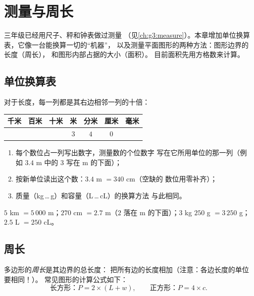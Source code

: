 \chapter{测量与周长}\label{ch:g4:measure}

三年级已经用尺子、秤和钟表做过测量
（见\cref{ch:g3:measure}）。本章增加单位换算表，它像一台能换算一切的“机器”，
以及测量平面图形的两种方法：图形边界的长度（周长），
和图形内部占据的大小（面积）。
目前面积先用方格数来计算。

\section{单位换算表}

\begin{method}[用换算表进行换算]\label{met:g4:measure:table}
对于长度，每一列都是其右边相邻一列的十倍：
\begin{center}
\renewcommand{\arraystretch}{1.3}
\begin{tabular}{c|c|c|c|c|c|c}
千米 & 百米 & 十米 & 米 & 分米 & 厘米 & 毫米 \\
\hline
 & & & $3$ & $4$ & $0$ & \\
\end{tabular}
\end{center}
\begin{enumerate}
  \item 每个数位占一列写出数字，测量数的个位数字
        写在它所用单位的那一列（例如 $3.4$ m 中的 $3$
        写在 m 的下面）；
  \item 按新单位读出这个数：$3.4$ m $= 340$ cm（空缺的
        数位用零补齐）；
  \item 质量（kg\,\dots\,g）和容量（L\,\dots\,cL）的换算方法
        与此相同。
\end{enumerate}
\end{method}

\begin{example}\label{ex:g4:measure:convert}
$5$ km $= 5\,000$ m；\quad $270$ cm $= 2.7$ m（$2$ 落在
m 的下面）；\quad $3$ kg $250$ g $= 3\,250$ g；\quad
$2.5$ L $= 250$ cL。
\end{example}

\section{周长}

\begin{definition}[周长]\label{def:g4:measure:perimeter}
多边形的\emph{周长}是其边界的总长度：
把所有边的长度相加（注意：各边长度的单位要相同！）。
常见图形的计算公式如下：
\[
\text{长方形：} P = 2 \times (L + w),
\qquad
\text{正方形：} P = 4 \times c .
\]
\end{definition}

